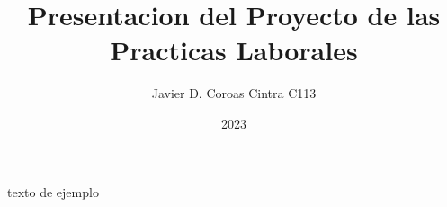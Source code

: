 \documentclass{article}
\title{Presentacion del Proyecto de las Practicas Laborales}
\author{Javier D. Coroas Cintra C113}
\date{2023}
\begin{document}
\maketitle

texto de ejemplo
\end{document}
